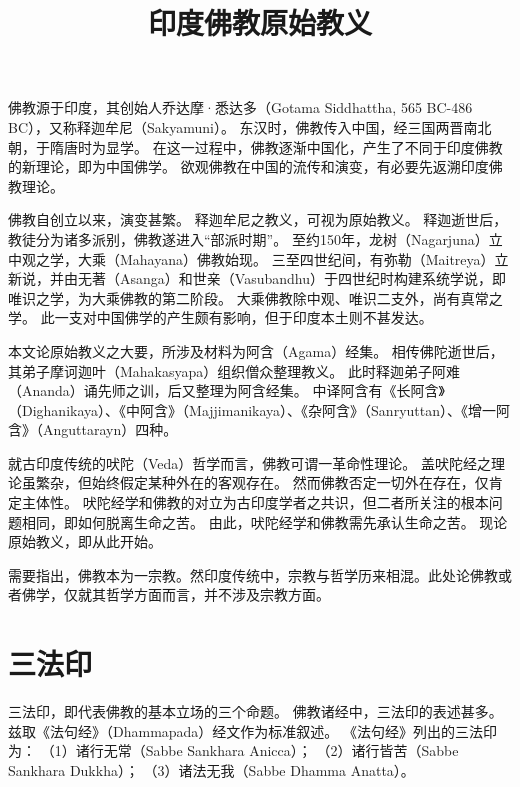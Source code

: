 \documentclass[11pt]{article}
\title{印度佛教原始教义}
\date{}
\begin{document}
  \maketitle

  \linenumbers

佛教源于印度，其创始人乔达摩·悉达多（Gotama Siddhattha, 565 BC-486 BC），又称释迦牟尼（Sakyamuni）。
东汉时，佛教传入中国，经三国两晋南北朝，于隋唐时为显学。
在这一过程中，佛教逐渐中国化，产生了不同于印度佛教的新理论，即为中国佛学。
欲观佛教在中国的流传和演变，有必要先返溯印度佛教理论。

\par

佛教自创立以来，演变甚繁。
释迦牟尼之教义，可视为原始教义。
释迦逝世后，教徒分为诸多派别，佛教遂进入“部派时期”。
至约150年，龙树（Nagarjuna）立中观之学，大乘（Mahayana）佛教始现。
三至四世纪间，有弥勒（Maitreya）立新说，并由无著（Asanga）和世亲（Vasubandhu）于四世纪时构建系统学说，即唯识之学，为大乘佛教的第二阶段。
大乘佛教除中观、唯识二支外，尚有真常之学。
此一支对中国佛学的产生颇有影响，但于印度本土则不甚发达。

\par

本文论原始教义之大要，所涉及材料为阿含（Agama）经集。
相传佛陀逝世后，其弟子摩诃迦叶（Mahakasyapa）组织僧众整理教义。
此时释迦弟子阿难（Ananda）诵先师之训，后又整理为阿含经集。
中译阿含有《长阿含》（Dighanikaya）、《中阿含》（Majjimanikaya）、《杂阿含》（Sanryuttan）、《增一阿含》（Anguttarayn）四种。

\par

就古印度传统的吠陀（Veda）哲学而言，佛教可谓一革命性理论。
盖吠陀经之理论虽繁杂，但始终假定某种外在的客观存在。
然而佛教否定一切外在存在，仅肯定主体性。
吠陀经学和佛教的对立为古印度学者之共识，但二者所关注的根本问题相同，即如何脱离生命之苦。
由此，吠陀经学和佛教需先承认生命之苦。
现论原始教义，即从此开始。

\par

需要指出，佛教本为一宗教。然印度传统中，宗教与哲学历来相混。此处论佛教或者佛学，仅就其哲学方面而言，并不涉及宗教方面。
    
\section{三法印}
三法印，即代表佛教的基本立场的三个命题。
佛教诸经中，三法印的表述甚多。
兹取《法句经》（Dhammapada）经文作为标准叙述。
《法句经》列出的三法印为：
（1）诸行无常（Sabbe Sankhara Anicca）；
（2）诸行皆苦（Sabbe Sankhara Dukkha）；
（3）诸法无我（Sabbe Dhamma Anatta）。
\end{document}
